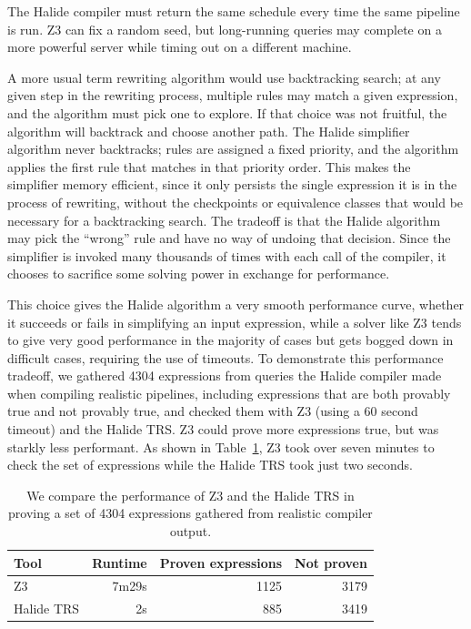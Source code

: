 \documentclass[sigplan,10pt,review,anonymous]{acmart}\settopmatter{printfolios=true,printccs=false,printacmref=false}
\begin{document}
The Halide compiler must return the same schedule every time the same pipeline is run. Z3 can fix a random seed, but long-running queries may complete on a more powerful server while timing out on a different machine.

A more usual term rewriting algorithm would use backtracking search; at any given step in the rewriting process, multiple rules may match a given expression, and the algorithm must pick one to explore. If that choice was not fruitful, the algorithm will backtrack and choose another path. The Halide simplifier algorithm never backtracks; rules are assigned a fixed priority, and the algorithm applies the first rule that matches in that priority order. This makes the simplifier memory efficient, since it only persists the single expression it is in the process of rewriting, without the checkpoints or equivalence classes that would be necessary for a backtracking search. The tradeoff is that the Halide algorithm may pick the ``wrong'' rule and have no way of undoing that decision. Since the simplifier is invoked many thousands of times with each call of the compiler, it chooses to sacrifice some solving power in exchange for performance. 

This choice gives the Halide algorithm a very smooth performance curve, whether it succeeds or fails in simplifying an input expression, while a solver like Z3 tends to give very good performance in the majority of cases but gets bogged down in difficult cases, requiring the use of timeouts. To demonstrate this performance tradeoff, we gathered 4304 expressions from queries the Halide compiler made when compiling realistic pipelines, including expressions that are both provably true and not provably true, and checked them with Z3 (using a 60 second timeout) and the Halide TRS. Z3 could prove more expressions true, but was starkly less performant. As shown in Table~\ref{tab:simplifiervsz3}, Z3 took over seven minutes to check the set of expressions while the Halide TRS took just two seconds. 

\begin{table}
\caption{We compare the performance of Z3 and the Halide TRS in proving a set of 4304 expressions gathered from realistic compiler output.}
\begin{tabular}{l|r|r|r}
Tool & Runtime & Proven expressions & Not proven \\
\hline
Z3 & 7m29s & 1125 & 3179 \\
Halide TRS & 2s & 885 & 3419 
\end{tabular}
\label{tab:simplifiervsz3}
\end{table}
\end{document}
